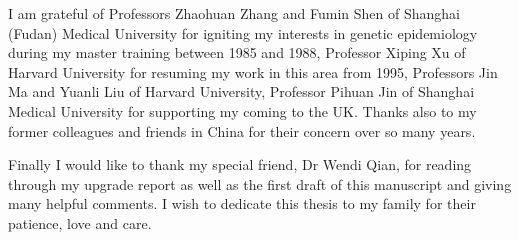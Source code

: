 I am grateful of Professors Zhaohuan Zhang and Fumin Shen of Shanghai (Fudan)
Medical University for igniting my interests in genetic epidemiology during my
master training between 1985 and 1988, Professor Xiping Xu of Harvard
University for resuming my work in this area from 1995, Professors Jin Ma and
Yuanli Liu of Harvard University, Professor Pihuan Jin of Shanghai Medical
University for supporting my coming to the UK.  Thanks also to my former
colleagues and friends in China for their concern over so many years.

Finally I would like to thank my special friend, Dr Wendi Qian, for reading
through my upgrade report as well as the first draft of this manuscript and
giving many helpful comments.  I wish to dedicate this thesis to my family for
their patience, love and care.
